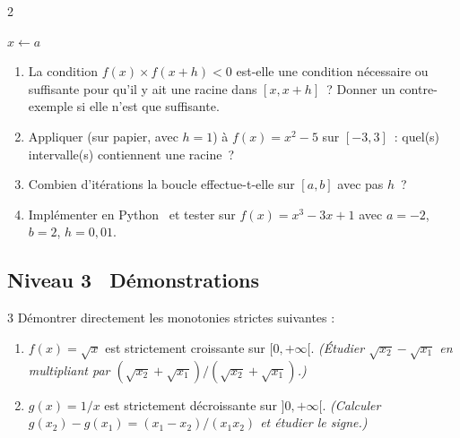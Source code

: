 \begin{exo}{2}

\begin{algorithm}[H]
\caption{Recherche de z\'ero par balayage}
$x \leftarrow a$\;
\end{algorithm}

\begin{enumerate}
  \item La condition $f(x)\times f(x+h)<0$ est-elle une condition n\'ecessaire
        ou suffisante pour qu'il y ait une racine dans $[x,x+h]$~?
        Donner un contre-exemple si elle n'est que suffisante.
  \item Appliquer (sur papier, avec $h=1$) \`a $f(x)=x^2-5$ sur $[-3,3]$~:
        quel(s) intervalle(s) contiennent une racine~?
  \item Combien d'it\'erations la boucle effectue-t-elle sur $[a,b]$ avec pas $h$~?
  \item Impl\'ementer en Python \computer\ et tester sur $f(x)=x^3-3x+1$
        avec $a=-2$, $b=2$, $h=0{,}01$.
\end{enumerate}
\end{exo}

\subsection*{\quad Niveau 3 \textemdash\ D\'emonstrations}

\begin{exo}{3}
D\'emontrer directement les monotonies strictes suivantes :
\begin{enumerate}
  \item $f(x)=\sqrt{x}$ est strictement croissante sur $[0,+\infty[$.
        \emph{(\'Etudier $\sqrt{x_2}-\sqrt{x_1}$ en multipliant par
        $(\sqrt{x_2}+\sqrt{x_1})/(\sqrt{x_2}+\sqrt{x_1})$.)}
  \item $g(x)=1/x$ est strictement d\'ecroissante sur $]0,+\infty[$.
        \emph{(Calculer $g(x_2)-g(x_1)=(x_1-x_2)/(x_1 x_2)$ et \'etudier le signe.)}
\end{enumerate}
\end{exo}

